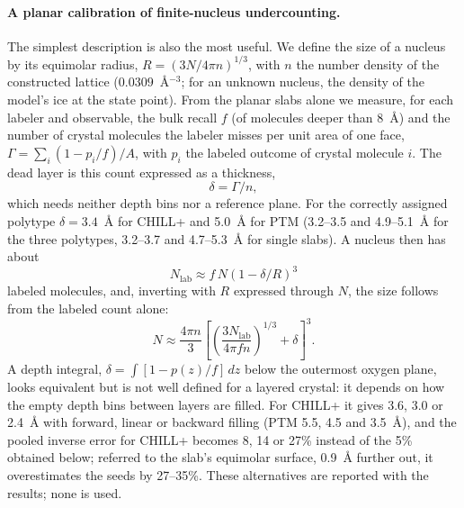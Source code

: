 \documentclass[11pt,a4paper]{article}
\begin{document}
\paragraph{A planar calibration of finite-nucleus undercounting.} The
simplest description is also the most useful. We define the size of a
nucleus by its equimolar radius, $R=(3N/4\pi n)^{1/3}$, with $n$ the number
density of the constructed lattice ($0.0309$~\AA$^{-3}$; for an unknown
nucleus, the density of the model's ice at the state point). From the planar
slabs alone we measure, for each labeler and observable, the bulk recall $f$
(of molecules deeper than 8~\AA) and the number of crystal molecules the
labeler misses per unit area of one face, $\Gamma=\sum_i(1-p_i/f)/A$, with
$p_i$ the labeled outcome of crystal molecule $i$. The dead layer is this
count expressed as a thickness,
\begin{equation}
  \delta=\Gamma/n ,
  \label{eq:deadlayer}
\end{equation}
which needs neither depth bins nor a reference plane. For the correctly
assigned polytype $\delta=3.4$~\AA{} for CHILL+ and 5.0~\AA{} for PTM
(3.2--3.5 and 4.9--5.1~\AA{} for the three polytypes, 3.2--3.7 and
4.7--5.3~\AA{} for single slabs). A nucleus then has about
\begin{equation}
  N_\mathrm{lab} \approx f\,N\left(1-\delta/R\right)^3
  \label{eq:forward}
\end{equation}
labeled molecules, and, inverting with $R$ expressed through $N$, the size
follows from the labeled count alone:
\begin{equation}
  N \approx \frac{4\pi n}{3}\left[\left(\frac{3N_\mathrm{lab}}{4\pi f n}\right)^{1/3}+\delta\right]^3 .
  \label{eq:inverse}
\end{equation}
A depth integral, $\delta=\int[1-p(z)/f]\,dz$ below the outermost oxygen
plane, looks equivalent but is not well defined for a layered crystal: it
depends on how the empty depth bins between layers are filled. For CHILL+ it
gives 3.6, 3.0 or 2.4~\AA{} with forward, linear or backward filling (PTM
5.5, 4.5 and 3.5~\AA), and the pooled inverse error for CHILL+ becomes 8, 14
or 27\% instead of the 5\% obtained below; referred to the slab's equimolar
surface, 0.9~\AA{} further out, it overestimates the seeds by 27--35\%. These alternatives are reported with the
results; none is used.
\end{document}
